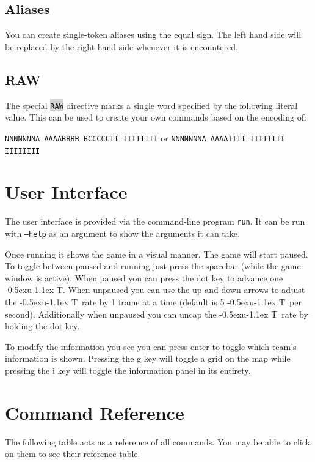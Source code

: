 \documentclass{article}
\newcommand{\vnscode}[1]{\colorbox{lightgray}{\lstinline[language=vns]{#1}}}
\newcommand{\UT}{\lower-0.5ex\hbox{u}\kern-1.1ex T}
\begin{document}
\subsection{Aliases}

You can create single-token aliases using the equal sign. The left hand side
will be replaced by the right hand side whenever it is encountered.

\subsection{RAW}

The special \vnscode{RAW} directive marks a single word specified by the
following literal value. This can be used to create your own commands based on
the encoding of:

\texttt{NNNNNNNA AAAABBBB BCCCCCII IIIIIIII} or \texttt{NNNNNNNA AAAAIIII IIIIIIII IIIIIIII}

\section{User Interface}

The user interface is provided via the command-line program \texttt{run}. It can
be run with \texttt{--help} as an argument to show the arguments it can take.

Once running it shows the game in a visual manner. The game will start paused.
To toggle between paused and running just press the spacebar (while the game
window is active). When paused you can press the dot key to advance one \UT.
When unpaused you can use the up and down arrows to adjust the \UT\ rate by 1
frame at a time (default is 5 \UT\ per second). Additionally when unpaused you
can uncap the \UT\ rate by holding the dot key.

To modify the information you see you can press enter to toggle which team's
information is shown. Pressing the g key will toggle a grid on the map while
pressing the i key will toggle the information panel in its entirety.

\section{Command Reference}

The following table acts as a reference of all commands. You may be able to
click on them to see their reference table.
\end{document}
